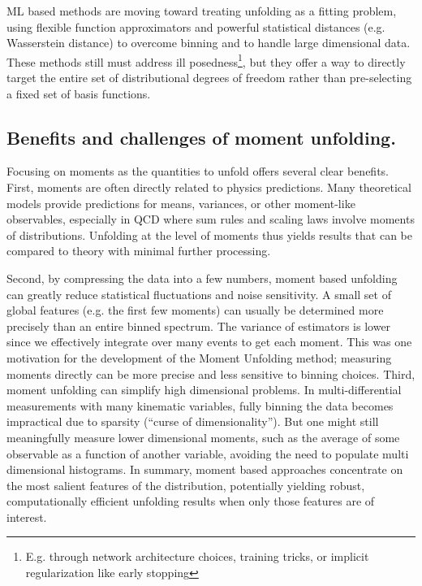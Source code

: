 {{            ML based methods are moving toward treating unfolding as a fitting problem, using flexible function approximators and powerful statistical distances (e.g. Wasserstein distance) to overcome binning and to handle large dimensional data.
            These methods still must address ill posedness\footnote{E.g. through network architecture choices, training tricks, or implicit regularization like early stopping}, but they offer a way to directly target the entire set of distributional degrees of freedom rather than pre-selecting a fixed set of basis functions.
    \subsection{Benefits and challenges of moment unfolding.}
        Focusing on moments as the quantities to unfold offers several clear benefits.
        First, moments are often directly related to physics predictions.
        Many theoretical models provide predictions for means, variances, or other moment-like observables, especially in QCD where sum rules and scaling laws involve moments of distributions.
        Unfolding at the level of moments thus yields results that can be compared to theory with minimal further processing.
        
        Second, by compressing the data into a few numbers, moment based unfolding can greatly reduce statistical fluctuations and noise sensitivity.
        A small set of global features (e.g. the first few moments) can usually be determined more precisely than an entire binned spectrum.
        The variance of estimators is lower since we effectively integrate over many events to get each moment.
        This was one motivation for the development of the Moment Unfolding method;
        measuring moments directly can be more precise and less sensitive to binning choices.
        Third, moment unfolding can simplify high dimensional problems.
        In multi-differential measurements with many kinematic variables, fully binning the data becomes impractical due to sparsity (``curse of dimensionality'').
        But one might still meaningfully measure lower dimensional moments, such as the average of some observable as a function of another variable, avoiding the need to populate multi dimensional histograms.
        In summary, moment based approaches concentrate on the most salient features of the distribution, potentially yielding robust, computationally efficient unfolding results when only those features are of interest.

}}
